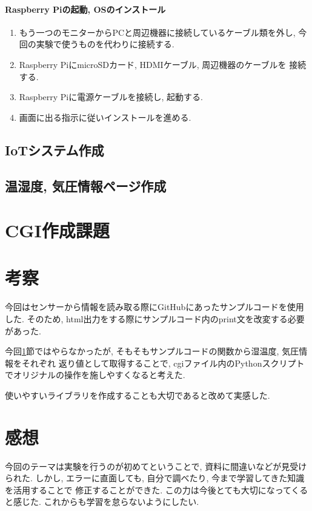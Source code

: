 \documentclass[titlepage]{jsarticle}
\begin{document}
            \paragraph{Raspberry Piの起動, OSのインストール}
                \begin{enumerate}
                    \item もう一つのモニターからPCと周辺機器に接続しているケーブル類を外し,
                        今回の実験で使うものを代わりに接続する.
                    \item Raspberry PiにmicroSDカード, HDMIケーブル, 周辺機器のケーブルを
                        接続する.
                    \item Raspberry Piに電源ケーブルを接続し, 起動する.
                    \item 画面に出る指示に従いインストールを進める.
                \end{enumerate}

    \subsection{IoTシステム作成}

    \subsection{温湿度, 気圧情報ページ作成}

\section{CGI作成課題} \label{kadai}


\section{考察}
    今回はセンサーから情報を読み取る際にGitHubにあったサンプルコードを使用した.
    そのため, html出力をする際にサンプルコード内のprint文を改変する必要があった.

    今回\ref{kadai}節ではやらなかったが, そもそもサンプルコードの関数から湿温度, 気圧情報をそれぞれ
    返り値として取得することで, cgiファイル内のPythonスクリプトでオリジナルの操作を施しやすくなると考えた.

    使いやすいライブラリを作成することも大切であると改めて実感した.

\section{感想}
    今回のテーマは実験を行うのが初めてということで, 資料に間違いなどが見受けられた.
    しかし, エラーに直面しても, 自分で調べたり, 今まで学習してきた知識を活用することで
    修正することができた. この力は今後とても大切になってくると感じた.
    これからも学習を怠らないようにしたい.
\end{document}
